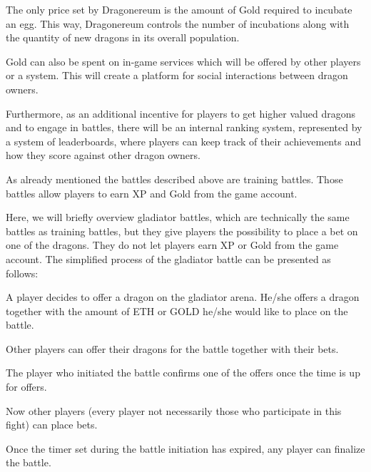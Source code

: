 \documentclass[12pt]{article}
\begin{document}
The only price set by Dragonereum is the amount of Gold required to incubate an egg. This way, Dragonereum controls the number of incubations along with the quantity of new dragons in its overall population.\par

Gold can also be spent on in-game services which will be offered by other players or a system. This will create a platform for social interactions between dragon owners.\par

Furthermore, as an additional incentive for players to get higher valued dragons and to engage in battles, there will be an internal ranking system, represented by a system of leaderboards, where players can keep track of their achievements and how they score against other dragon owners.\par

As already mentioned the battles described above are training battles. Those battles allow players to earn XP and Gold from the game account.\par

Here, we will briefly overview gladiator battles, which are technically the same battles as training battles, but they give players the possibility to place a bet on one of the dragons. They do not let players earn XP or Gold from the game account. The simplified process of the gladiator battle can be presented as follows:\par


\begin{itemize}
  \begin{samepage}
    \item A player decides to offer a dragon on the gladiator arena. He/she offers a dragon together with the amount of ETH or GOLD he/she would like to place on the battle.
    \item Other players can offer their dragons for the battle together with their bets.
    \item The player who initiated the battle confirms one of the offers once the time is up for offers.
    \item Now other players (every player not necessarily those who participate in this fight) can place bets.
    \item Once the timer set during the battle initiation has expired, any player can finalize the battle.
  \end{samepage}
\end{itemize}
\end{document}
